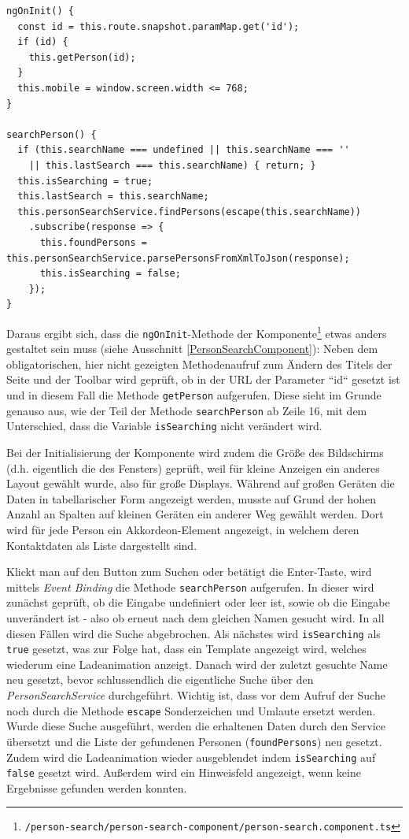 \begin{lstlisting}[float, floatplacement=h, style=htmlcssjs, caption={Ausschnitt aus \texttt{PersonSearchComponent}}, label={PersonSearchComponent}]
ngOnInit() {
  const id = this.route.snapshot.paramMap.get('id');
  if (id) {
    this.getPerson(id);
  }
  this.mobile = window.screen.width <= 768;
}

searchPerson() {
  if (this.searchName === undefined || this.searchName === ''
    || this.lastSearch === this.searchName) { return; }
  this.isSearching = true;
  this.lastSearch = this.searchName;
  this.personSearchService.findPersons(escape(this.searchName))
    .subscribe(response => {
      this.foundPersons = this.personSearchService.parsePersonsFromXmlToJson(response);
      this.isSearching = false;
    });
}
\end{lstlisting}
Daraus ergibt sich, dass die \texttt{ngOnInit}-Methode der Komponente\footnote{\texttt{/person-search/person-search-component/person-search.component.ts}} etwas anders gestaltet sein muss (siehe Ausschnitt \ref{PersonSearchComponent}): Neben dem obligatorischen, hier nicht gezeigten Methodenaufruf zum Ändern des Titels der Seite und der Toolbar wird geprüft, ob in der \acs{URL} der Parameter ``id`` gesetzt ist und in diesem Fall die Methode \texttt{getPerson} aufgerufen. Diese sieht im Grunde genauso aus, wie der Teil der Methode \texttt{searchPerson} ab Zeile 16, mit dem Unterschied, dass die Variable \texttt{isSearching} nicht verändert wird.

Bei der Initialisierung der Komponente wird zudem die Größe des Bildschirms (d.h. eigentlich die des Fensters) geprüft, weil für kleine Anzeigen ein anderes Layout gewählt wurde, also für große Displays. Während auf großen Geräten die Daten in tabellarischer Form angezeigt werden, musste auf Grund der hohen Anzahl an Spalten auf kleinen Geräten ein anderer Weg gewählt werden. Dort wird für jede Person ein Akkordeon-Element angezeigt, in welchem deren Kontaktdaten als Liste dargestellt sind.

Klickt man auf den Button zum Suchen oder betätigt die Enter-Taste, wird mittels \textit{Event Binding} die Methode \texttt{searchPerson} aufgerufen. In dieser wird zunächst geprüft, ob die Eingabe undefiniert oder leer ist, sowie ob die Eingabe unverändert ist - also ob erneut nach dem gleichen Namen gesucht wird. In all diesen Fällen wird die Suche abgebrochen. Als nächstes wird \texttt{isSearching} als \texttt{true} gesetzt, was zur Folge hat, dass ein Template angezeigt wird, welches wiederum eine Ladeanimation anzeigt. Danach wird der zuletzt gesuchte Name neu gesetzt, bevor schlussendlich die eigentliche Suche über den \textit{PersonSearchService} durchgeführt. Wichtig ist, dass vor dem Aufruf der Suche noch durch die Methode \texttt{escape} Sonderzeichen und Umlaute ersetzt werden. Wurde diese Suche ausgeführt, werden die erhaltenen Daten durch den Service übersetzt und die Liste der gefundenen Personen (\texttt{foundPersons}) neu gesetzt. Zudem wird die Ladeanimation wieder ausgeblendet indem \texttt{isSearching} auf \texttt{false} gesetzt wird. Außerdem wird ein Hinweisfeld angezeigt, wenn keine Ergebnisse gefunden werden konnten.

